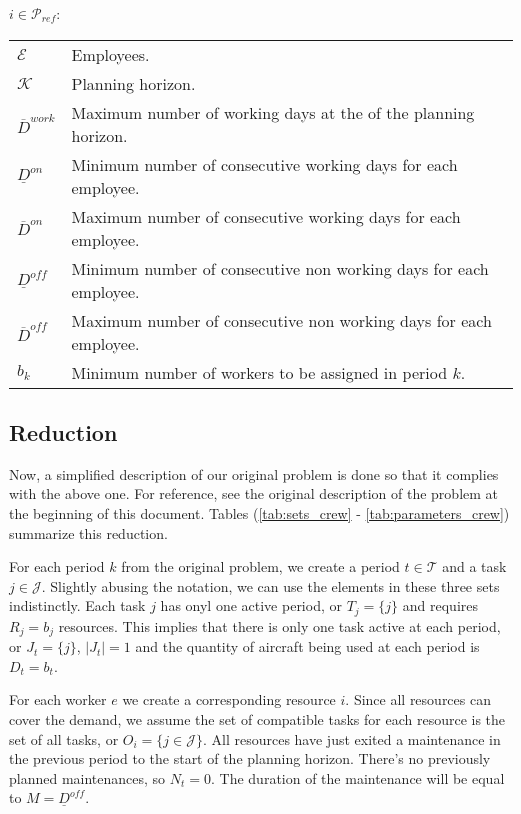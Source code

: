 \documentclass[a4paper,11pt]{article}
\begin{document}
    $i \in \mathcal{P}_{ref}$:

    \begin{tabular}{ll}
        $\mathcal{E}$          & Employees. \\
        $\mathcal{K}$          & Planning horizon. \\
        $\overline{D}^{work}$  & Maximum number of working days at the of the planning horizon.    \\
        $\underline{D}^{on}$   & Minimum number of consecutive working days for each employee.     \\
        $\overline{D}^{on}$    & Maximum number of consecutive working days for each employee.     \\
        $\underline{D}^{off}$  & Minimum number of consecutive non working days for each employee. \\
        $\overline{D}^{off}$   & Maximum number of consecutive non working days for each employee. \\
        $b_k$                  & Minimum number of workers to be assigned in period $k$. \\
    \end{tabular}

    \subsection{Reduction}

    Now, a simplified description of our original problem is done so that it complies with the above one. For reference, see the original description of the problem at the beginning of this document. Tables (\ref{tab:sets_crew} - \ref{tab:parameters_crew}) summarize this reduction.

    For each period $k$ from the original problem, we create a period $t \in \mathcal{T}$ and a task $j \in \mathcal{J}$. Slightly abusing the notation, we can use the elements in these three sets indistinctly. Each task $j$ has onyl one active period, or $T_j = \{j\}$ and requires $R_{j} = b_{j}$ resources. This implies that there is only one task active at each period, or $J_t = \{j\}$, $|J_t|=1$ and the quantity of aircraft being used at each period is $D_t = b_{t}$.

    For each worker $e$ we create a corresponding resource $i$.
    Since all resources can cover the demand, we assume the set of compatible tasks for each resource is the set of all tasks, or $O_i = \{j \in \mathcal{J}\}$.
    All resources have just exited a maintenance in the previous period to the start of the planning horizon. There's no previously planned maintenances, so $N_t = 0$.
    The duration of the maintenance will be equal to $M = \underline{D}^{off}$.
\end{document}
